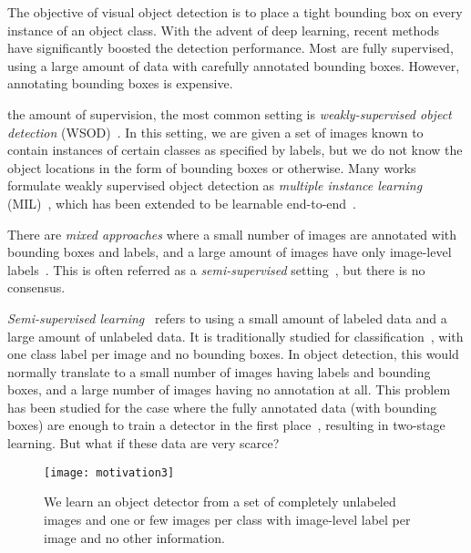 \documentclass[review]{elsarticle}
\begin{document}
The objective of {visual object detection} is to place a tight bounding box on every instance of an object class. With the advent of deep learning, recent methods~\cite{frcnn,ren2015nips} have significantly boosted the detection performance. Most are fully supervised, using a large amount of data with carefully annotated bounding boxes. However, annotating bounding boxes is expensive.


the amount of supervision, the most common setting is \emph{weakly-supervised object detection} (WSOD)~\cite{cinbis2014cvpr,wsddn,shi2016eccv,tang2017cvpr,tang2018eccv,shen2019cvpr,cvpr20efficientwsod}. In this setting,
we are given a set of images known to contain instances of certain classes as specified by labels, but we do not know the object locations in the form of bounding boxes or otherwise.
Many works~\cite{cinbis2014cvpr,shi2016eccv,shi2017arxiv}
formulate weakly supervised object detection as \emph{multiple instance learning} (MIL)~\cite{andrews2003nips}, which has been extended to be learnable end-to-end~\cite{wsddn,tang2017cvpr}.

There are \emph{mixed approaches} where a small number of images are annotated with bounding boxes and labels, and a large amount of images have only image-level labels~\cite{tang2016cvpr,hoffman2015cvpr,yan2017arxiv}. 
This is often referred as a \emph{semi-supervised} setting~\cite{tang2016cvpr,yan2017arxiv}, but there is no consensus.

\emph{Semi-supervised learning}~\cite{CSZ06} refers to using a small amount of labeled data and a large amount of unlabeled data. It is traditionally studied for classification~\cite{WeRC08,Lee13,RBH+15}, with one class label per image and no bounding boxes. In object detection, this would normally translate to a small number of images having labels {and} bounding boxes, and a large number of images having {no annotation at all}. This problem has been studied for the case where the fully annotated data (with bounding boxes) are enough to train a detector in the first place~\cite{1802.06964,RDG+18}, resulting in two-stage learning. But what if these data are very scarce?

\begin{figure}[t]
	\centering
	\texttt{[image: motivation3]}
	\caption{We learn an object detector from a set of completely unlabeled images and one or few images per class with image-level label per image and no other information. 
}
	\label{Fig:moti}
\end{figure}
\end{document}
